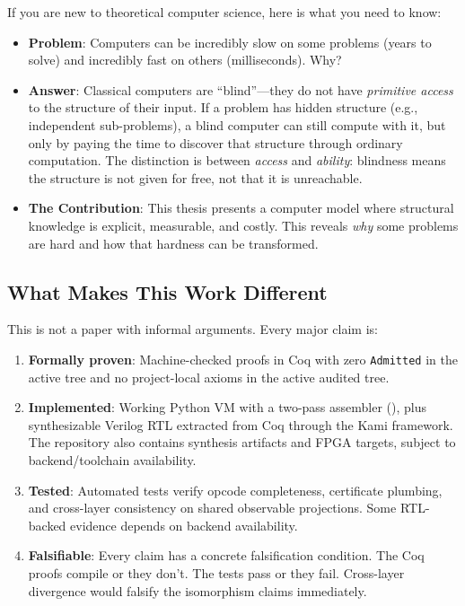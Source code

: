 If you are new to theoretical computer science, here is what you need to know:
\begin{itemize}
    \item \textbf{Problem}: Computers can be incredibly slow on some problems (years to solve) and incredibly fast on others (milliseconds). Why?
    \item \textbf{Answer}: Classical computers are ``blind''---they do not have \emph{primitive access} to the structure of their input. If a problem has hidden structure (e.g., independent sub-problems), a blind computer can still compute with it, but only by paying the time to discover that structure through ordinary computation. The distinction is between \emph{access} and \emph{ability}: blindness means the structure is not given for free, not that it is unreachable.
    \item \textbf{The Contribution}: This thesis presents a computer model where structural knowledge is explicit, measurable, and costly. This reveals \textit{why} some problems are hard and how that hardness can be transformed.
\end{itemize}

\subsection{What Makes This Work Different}

This is not a paper with informal arguments. Every major claim is:
\begin{enumerate}
    \item \textbf{Formally proven}: Machine-checked proofs in Coq with zero \texttt{Admitted} in the active tree and no project-local axioms in the active audited tree.
    \item \textbf{Implemented}: Working Python VM with a two-pass assembler (), plus synthesizable Verilog RTL extracted from Coq through the Kami framework. The repository also contains synthesis artifacts and FPGA targets, subject to backend/toolchain availability.
    \item \textbf{Tested}: Automated tests verify opcode completeness, certificate plumbing, and cross-layer consistency on shared observable projections. Some RTL-backed evidence depends on backend availability.
    \item \textbf{Falsifiable}: Every claim has a concrete falsification condition. The Coq proofs compile or they don't. The tests pass or they fail. Cross-layer divergence would falsify the isomorphism claims immediately.
\end{enumerate}

